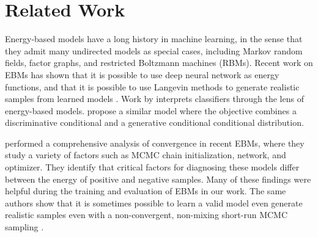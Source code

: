 \documentclass{article}
\begin{document}
\section{Related Work}
\label{sec:related-work}
\vspace*{-1.0ex}



Energy-based models \cite{lecun2006tutorial} have a long history in machine learning, in the sense that they admit many undirected models as special cases, including Markov random fields, factor graphs, and restricted Boltzmann machines (RBMs). Recent work on EBMs has shown that it is possible to use deep neural network as energy functions, and that it is possible to use Langevin methods to generate realistic samples from learned models \cite{du2019implicit,xie2016theory}. Work by \citet{grathwohl2019your} interprets classifiers through the lens of energy-based models. \citet{liu2020hybrid} propose a similar model where the objective combines a discriminative conditional and a generative conditional conditional distribution. %


\citet{nijkamp2019anatomy, nijkamp2019learning} performed a comprehensive analysis of convergence in recent EBMs, where they study a variety of factors such as MCMC chain initialization, network, and optimizer. They identify that critical factors for diagnosing these models differ between the energy of positive and negative samples. Many of these findings were helpful during the training and evaluation of EBMs in our work. The same authors show that it is sometimes possible to learn a valid model even generate realistic samples even with a non-convergent, non-mixing short-run MCMC sampling  \cite{nijkamp2019learning}. 
\end{document}
